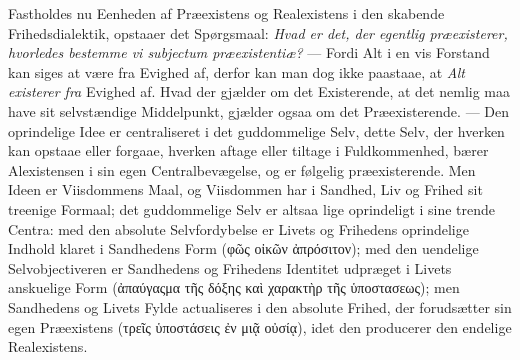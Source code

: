 \documentclass[12pt]{book}
\begin{document}
Fastholdes nu Eenheden af Præexistens og Realexistens i den skabende Frihedsdialektik,
opstaaer det Spørgsmaal: \emph{Hvad er det, der egentlig præexisterer, hvorledes bestemme
vi \textit{subjectum præexistentiæ}?} --- Fordi Alt i en vis Forstand kan siges at være
fra Evighed af, derfor kan man dog ikke paastaae, at \emph{Alt existerer fra} Evighed af.
Hvad der gjælder om det Existerende, at det nemlig maa have sit selvstændige
Middelpunkt, gjælder ogsaa om det Præexisterende. --- Den oprindelige Idee er
centraliseret i det guddommelige Selv, dette Selv, der hverken kan opstaae eller
forgaae, hverken aftage eller tiltage i Fuldkommenhed, bærer Alexistensen i sin egen
Centralbevægelse, og er følgelig præexisterende. Men Ideen er Viisdommens Maal, og
Viisdommen har i Sandhed, Liv og Frihed sit treenige Formaal; det guddommelige Selv er
altsaa lige oprindeligt i sine trende Centra: med den absolute Selvfordybelse er Livets
og Frihedens oprindelige Indhold klaret i Sandhedens Form (φῶς οἰκῶν ἀπρόσιτον); med den
uendelige Selvobjectiveren er Sandhedens og Frihedens Identitet udpræget i Livets
anskuelige Form (ἀπαύγαςμα τῆς δόξης καὶ χαρακτὴρ τῆς ὑποστασεως); men Sandhedens og
Livets Fylde actualiseres i den absolute Frihed, der forudsætter sin egen Præexistens
(τρεῖς ὑποστάσεις ἐν μιᾷ οὐσίᾳ), idet den producerer den endelige Realexistens.
\end{document}
